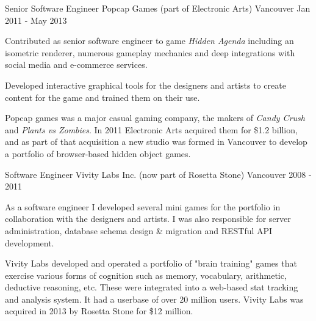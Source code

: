 \begin{cventries}
  \cventrywithsummary
    {Senior Software Engineer} %
    {Popcap Games (part of Electronic Arts)} %
    {Vancouver} %
    {Jan 2011 - May 2013} %
    {
      \begin{cvitems} %
        \item {Contributed as senior software engineer to game \textit{Hidden Agenda} including an isometric renderer, numerous gameplay mechanics and deep integrations with social media and e-commerce services.}
        \item {Developed interactive graphical tools for the designers and artists to create content for the game and trained them on their use.}
      \end{cvitems}
    }
    {
      Popcap games was a major casual gaming company, the makers of \textit{Candy Crush} and \textit{Plants vs Zombies}. In 2011 Electronic Arts acquired them for \$1.2 billion, and as part of that acquisition a new studio was formed in Vancouver to develop a portfolio of browser-based hidden object games.
    }

  \cventrywithsummary
    {Software Engineer} %
    {Vivity Labs Inc. (now part of Rosetta Stone)} %
    {Vancouver} %
    {2008 - 2011} %
    {
      \begin{cvitems} %
        \item {As a software engineer I developed several mini games for the portfolio in collaboration with the designers and artists. I was also responsible for server administration, database schema design \& migration and RESTful API development.}
      \end{cvitems}
    }
    {
      Vivity Labs developed and operated a portfolio of "brain training" games that exercise various forms of cognition such as memory, vocabulary, arithmetic, deductive reasoning, etc. These were integrated into a web-based stat tracking and analysis system. It had a userbase of over 20 million users. Vivity Labs was acquired in 2013 by Rosetta Stone for \$12 million.
    }


\end{cventries}
